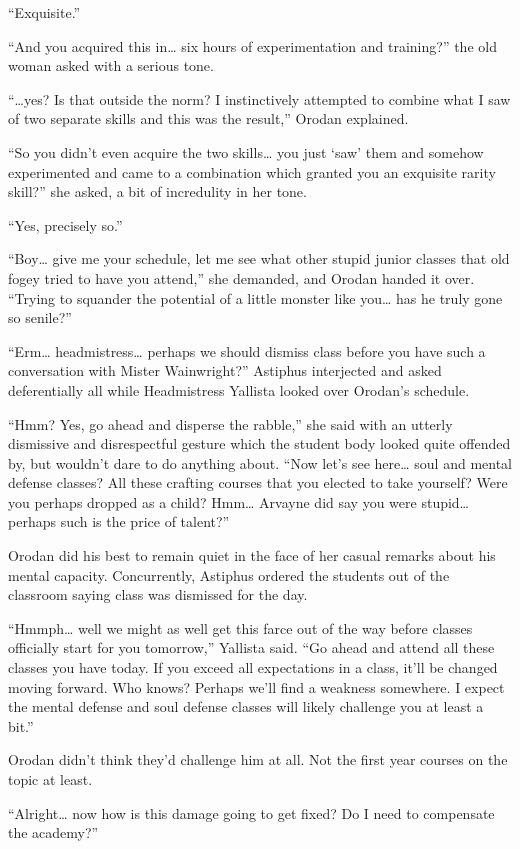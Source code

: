 \documentclass[a4paper,10pt]{book}
\begin{document}
“Exquisite.”\par
“And you acquired this in… six hours of experimentation and training?” the old woman asked with a serious tone.\par
“…yes? Is that outside the norm? I instinctively attempted to combine what I saw of two separate skills and this was the result,” Orodan explained.\par
“So you didn’t even acquire the two skills… you just ‘saw’ them and somehow experimented and came to a combination which granted you an exquisite rarity skill?” she asked, a bit of incredulity in her tone.\par
“Yes, precisely so.”\par
“Boy… give me your schedule, let me see what other stupid junior classes that old fogey tried to have you attend,” she demanded, and Orodan handed it over. “Trying to squander the potential of a little monster like you… has he truly gone so senile?”\par
“Erm… headmistress… perhaps we should dismiss class before you have such a conversation with Mister Wainwright?” Astiphus interjected and asked deferentially all while Headmistress Yallista looked over Orodan’s schedule.\par
“Hmm? Yes, go ahead and disperse the rabble,” she said with an utterly dismissive and disrespectful gesture which the student body looked quite offended by, but wouldn’t dare to do anything about. “Now let’s see here… soul and mental defense classes? All these crafting courses that you elected to take yourself? Were you perhaps dropped as a child? Hmm… Arvayne did say you were stupid… perhaps such is the price of talent?”\par
Orodan did his best to remain quiet in the face of her casual remarks about his mental capacity. Concurrently, Astiphus ordered the students out of the classroom saying class was dismissed for the day.\par
“Hmmph… well we might as well get this farce out of the way before classes officially start for you tomorrow,” Yallista said. “Go ahead and attend all these classes you have today. If you exceed all expectations in a class, it’ll be changed moving forward. Who knows? Perhaps we’ll find a weakness somewhere. I expect the mental defense and soul defense classes will likely challenge you at least a bit.”\par
Orodan didn’t think they’d challenge him at all. Not the first year courses on the topic at least.\par
“Alright… now how is this damage going to get fixed? Do I need to compensate the academy?”\par
\end{document}
